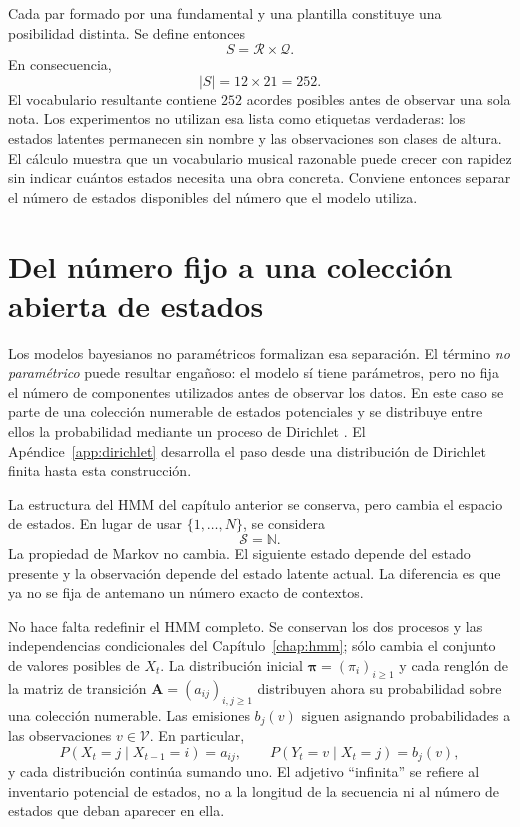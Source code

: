 Cada par formado por una fundamental y una plantilla constituye una posibilidad distinta. Se define entonces
\[
S=\mathcal{R}\times\mathcal{Q}.
\]
En consecuencia,
\[
\lvert S\rvert = 12\times 21 = 252.
\]
El vocabulario resultante contiene $252$ acordes posibles antes de observar una sola nota. Los experimentos no utilizan esa lista como etiquetas verdaderas: los estados latentes permanecen sin nombre y las observaciones son clases de altura. El cálculo muestra que un vocabulario musical razonable puede crecer con rapidez sin indicar cuántos estados necesita una obra concreta. Conviene entonces separar el número de estados disponibles del número que el modelo utiliza.

\section{Del número fijo a una colección abierta de estados}

Los modelos bayesianos no paramétricos formalizan esa separación. El término \emph{no paramétrico} puede resultar engañoso: el modelo sí tiene parámetros, pero no fija el número de componentes utilizados antes de observar los datos. En este caso se parte de una colección numerable de estados potenciales y se distribuye entre ellos la probabilidad mediante un proceso de Dirichlet \cite{ferguson1973,sethuraman1994}. El Apéndice~\ref{app:dirichlet} desarrolla el paso desde una distribución de Dirichlet finita hasta esta construcción.

La estructura del HMM del capítulo anterior se conserva, pero cambia el espacio de estados. En lugar de usar $\{1,\ldots,N\}$, se considera
\[
\mathcal{S}=\mathbb{N}.
\]
La propiedad de Markov no cambia. El siguiente estado depende del estado presente y la observación depende del estado latente actual. La diferencia es que ya no se fija de antemano un número exacto de contextos.

No hace falta redefinir el HMM completo. Se conservan los dos procesos y las independencias condicionales del Capítulo~\ref{chap:hmm}; sólo cambia el conjunto de valores posibles de $X_t$. La distribución inicial $\boldsymbol{\pi}=(\pi_i)_{i\geq 1}$ y cada renglón de la matriz de transición $\mathbf{A}=(a_{ij})_{i,j\geq 1}$ distribuyen ahora su probabilidad sobre una colección numerable. Las emisiones $b_j(v)$ siguen asignando probabilidades a las observaciones $v\in\mathcal{V}$. En particular,
\[
P(X_t=j\mid X_{t-1}=i)=a_{ij},
\qquad
P(Y_t=v\mid X_t=j)=b_j(v),
\]
y cada distribución continúa sumando uno. El adjetivo ``infinita'' se refiere al inventario potencial de estados, no a la longitud de la secuencia ni al número de estados que deban aparecer en ella.

